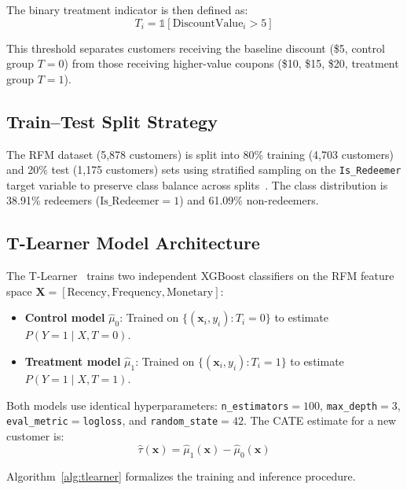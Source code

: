 \documentclass[11pt,a4paper,twoside]{article}
\begin{document}
The binary treatment indicator is then defined as:
\begin{equation}
T_i = \mathbb{1}[\text{DiscountValue}_i > 5]
\label{eq:treatment}
\end{equation}

This threshold separates customers receiving the baseline discount (\$5, control group $T=0$) from those receiving higher-value coupons (\$10, \$15, \$20, treatment group $T=1$).

\subsection{Train--Test Split Strategy}

The RFM dataset (5,878 customers) is split into 80\% training (4,703 customers) and 20\% test (1,175 customers) sets using stratified sampling on the \texttt{Is\_Redeemer} target variable to preserve class balance across splits~\cite{gutierrez2017}. The class distribution is 38.91\% redeemers ($\text{Is\_Redeemer}=1$) and 61.09\% non-redeemers.

\subsection{T-Learner Model Architecture}

The T-Learner~\cite{kunzel2019} trains two independent XGBoost classifiers on the RFM feature space $\mathbf{X} = [\text{Recency}, \text{Frequency}, \text{Monetary}]$:

\begin{itemize}
    \item \textbf{Control model} $\hat{\mu}_0$: Trained on $\{(\mathbf{x}_i, y_i) : T_i = 0\}$ to estimate $P(Y=1 \mid X, T=0)$.
    \item \textbf{Treatment model} $\hat{\mu}_1$: Trained on $\{(\mathbf{x}_i, y_i) : T_i = 1\}$ to estimate $P(Y=1 \mid X, T=1)$.
\end{itemize}

Both models use identical hyperparameters: \texttt{n\_estimators}$=100$, \texttt{max\_depth}$=3$, \texttt{eval\_metric}$=$\texttt{logloss}, and \texttt{random\_state}$=42$. The CATE estimate for a new customer is:
\begin{equation}
\hat{\tau}(\mathbf{x}) = \hat{\mu}_1(\mathbf{x}) - \hat{\mu}_0(\mathbf{x})
\label{eq:uplift}
\end{equation}

Algorithm~\ref{alg:tlearner} formalizes the training and inference procedure.
\end{document}
